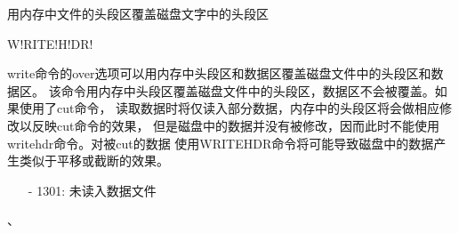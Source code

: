 \label{cmd:writehdr}

用内存中文件的头段区覆盖磁盘文字中的头段区

W!RITE!H!DR!

write命令的over选项可以用内存中头段区和数据区覆盖磁盘文件中的头段区和数据区。
该命令用内存中头段区覆盖磁盘文件中的头段区，数据区不会被覆盖。如果使用了cut命令，
读取数据时将仅读入部分数据，内存中的头段区将会做相应修改以反映cut命令的效果，
但是磁盘中的数据并没有被修改，因而此时不能使用writehdr命令。对被cut的数据
使用WRITEHDR命令将可能导致磁盘中的数据产生类似于平移或截断的效果。

\begin{itemize}
\item[-]1301: 未读入数据文件
\end{itemize}

、
